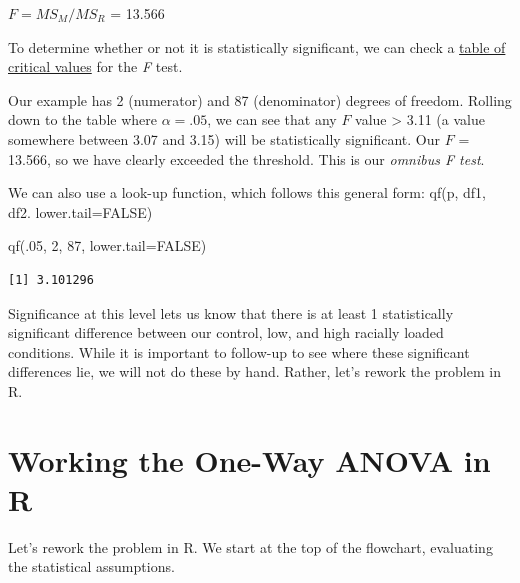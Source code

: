 \documentclass[
  11pt,
]{book}
\newenvironment{Shaded}{\begin{snugshade}}{\end{snugshade}}
\newcommand{\AttributeTok}[1]{\textcolor[rgb]{0.77,0.63,0.00}{#1}}
\newcommand{\ConstantTok}[1]{\textcolor[rgb]{0.00,0.00,0.00}{#1}}
\newcommand{\DecValTok}[1]{\textcolor[rgb]{0.00,0.00,0.81}{#1}}
\newcommand{\FunctionTok}[1]{\textcolor[rgb]{0.00,0.00,0.00}{#1}}
\newcommand{\NormalTok}[1]{#1}
\begin{document}
\(F = MS_{M}/MS_{R}\) = 13.566

To determine whether or not it is statistically significant, we can check a \href{https://www.statology.org/how-to-read-the-f-distribution-table/}{table of critical values} \citep{zach_how_2019} for the \emph{F} test.

Our example has 2 (numerator) and 87 (denominator) degrees of freedom. Rolling down to the table where \(\alpha = .05\), we can see that any \(F\) value \textgreater{} 3.11 (a value somewhere between 3.07 and 3.15) will be statistically significant. Our \(F\) = 13.566, so we have clearly exceeded the threshold. This is our \emph{omnibus F test}.

We can also use a look-up function, which follows this general form: qf(p, df1, df2. lower.tail=FALSE)

\begin{Shaded}
\begin{Highlighting}[]
\FunctionTok{qf}\NormalTok{(.}\DecValTok{05}\NormalTok{, }\DecValTok{2}\NormalTok{, }\DecValTok{87}\NormalTok{, }\AttributeTok{lower.tail=}\ConstantTok{FALSE}\NormalTok{)}
\end{Highlighting}
\end{Shaded}

\begin{verbatim}
[1] 3.101296
\end{verbatim}

Significance at this level lets us know that there is at least 1 statistically significant difference between our control, low, and high racially loaded conditions. While it is important to follow-up to see where these significant differences lie, we will not do these by hand. Rather, let's rework the problem in R.

\hypertarget{working-the-one-way-anova-in-r}{%
\section{Working the One-Way ANOVA in R}\label{working-the-one-way-anova-in-r}}

Let's rework the problem in R. We start at the top of the flowchart, evaluating the statistical assumptions.
\end{document}
